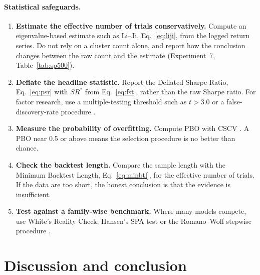 \documentclass[11pt]{article}
\begin{document}
\paragraph{Statistical safeguards.}
\begin{enumerate}[leftmargin=*,resume]
\item \textbf{Estimate the effective number of trials conservatively.} Compute an eigenvalue-based estimate such as Li--Ji, Eq.~\eqref{eq:liji}, from the logged return series. Do not rely on a cluster count alone, and report how the conclusion changes between the raw count and the estimate (Experiment~7, Table~\ref{tab:sp500}).
\item \textbf{Deflate the headline statistic.} Report the Deflated Sharpe Ratio, Eq.~\eqref{eq:psr} with $SR^*$ from Eq.~\eqref{eq:fst}, rather than the raw Sharpe ratio. For factor research, use a multiple-testing threshold such as $t > 3.0$ \citep{harvey2016} or a false-discovery-rate procedure \citep{benjamini1995}.
\item \textbf{Measure the probability of overfitting.} Compute PBO with CSCV \citep{bailey2017pbo}. A PBO near 0.5 or above means the selection procedure is no better than chance.
\item \textbf{Check the backtest length.} Compare the sample length with the Minimum Backtest Length, Eq.~\eqref{eq:minbtl}, for the effective number of trials. If the data are too short, the honest conclusion is that the evidence is insufficient.
\item \textbf{Test against a family-wise benchmark.} Where many models compete, use White's Reality Check, Hansen's SPA test or the Romano--Wolf stepwise procedure \citep{white2000,hansen2005,romano2005}.
\end{enumerate}

\section{Discussion and conclusion}\label{sec:disc}
\end{document}
